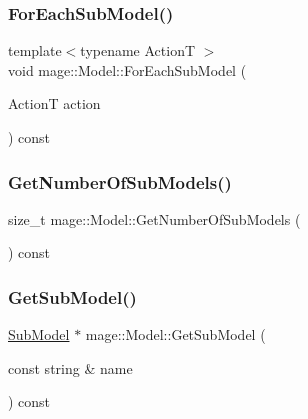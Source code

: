 \subsubsection{\texorpdfstring{For\+Each\+Sub\+Model()}{ForEachSubModel()}}
{\footnotesize\ttfamily template$<$typename ActionT $>$ \\
void mage\+::\+Model\+::\+For\+Each\+Sub\+Model (\begin{DoxyParamCaption}\item[{ActionT}]{action }\end{DoxyParamCaption}) const}

\hypertarget{classmage_1_1_model_a29ad2496b11ef5af5f179cfe52943cd3}{}\label{classmage_1_1_model_a29ad2496b11ef5af5f179cfe52943cd3} 
\subsubsection{\texorpdfstring{Get\+Number\+Of\+Sub\+Models()}{GetNumberOfSubModels()}}
{\footnotesize\ttfamily size\+\_\+t mage\+::\+Model\+::\+Get\+Number\+Of\+Sub\+Models (\begin{DoxyParamCaption}{ }\end{DoxyParamCaption}) const}

\hypertarget{classmage_1_1_model_a1cae9eb62a353445d14b5331e88bdeac}{}\label{classmage_1_1_model_a1cae9eb62a353445d14b5331e88bdeac} 
\subsubsection{\texorpdfstring{Get\+Sub\+Model()}{GetSubModel()}}
{\footnotesize\ttfamily \hyperlink{classmage_1_1_sub_model}{Sub\+Model} $\ast$ mage\+::\+Model\+::\+Get\+Sub\+Model (\begin{DoxyParamCaption}\item[{const string \&}]{name }\end{DoxyParamCaption}) const}

\hypertarget{classmage_1_1_model_a319fb9b9d9c673ed9c83325d5bcbdfd7}{}\label{classmage_1_1_model_a319fb9b9d9c673ed9c83325d5bcbdfd7} 

